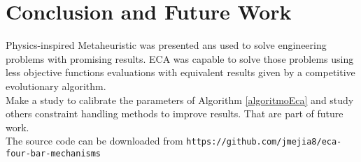 \documentclass[12pt,letterpape]{article}
\begin{document}
\section{Conclusion and Future Work} %
\label{sec:conclusion_and_future_work}

Physics-inspired Metaheuristic was presented ans used to solve engineering 
problems with promising results. ECA was capable to solve those problems using
less objective functions evaluations with equivalent results given by a 
competitive evolutionary algorithm.\\

Make a study to calibrate the parameters of Algorithm \ref{algoritmoEca} and
study others constraint handling methods to improve results. That are part of future work.\\

\noindent
The source code can be downloaded from
\verb|https://github.com/jmejia8/eca-four-bar-mechanisms|




\end{document}
